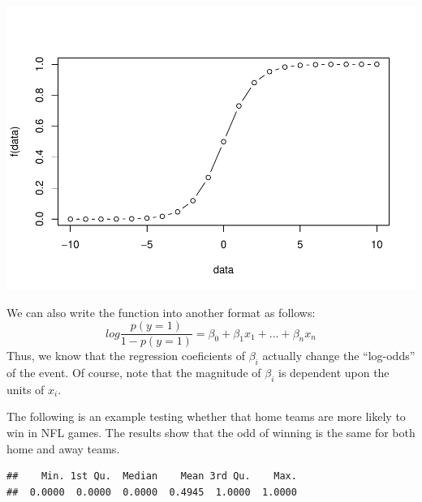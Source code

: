 \documentclass[]{book}
\newenvironment{Shaded}{\begin{snugshade}}{\end{snugshade}}
\newcommand{\KeywordTok}[1]{\textcolor[rgb]{0.13,0.29,0.53}{\textbf{#1}}}
\newcommand{\DecValTok}[1]{\textcolor[rgb]{0.00,0.00,0.81}{#1}}
\newcommand{\StringTok}[1]{\textcolor[rgb]{0.31,0.60,0.02}{#1}}
\newcommand{\OperatorTok}[1]{\textcolor[rgb]{0.81,0.36,0.00}{\textbf{#1}}}
\newcommand{\NormalTok}[1]{#1}
\begin{document}
\includegraphics{bookdown-demo_files/figure-latex/unnamed-chunk-1-1.pdf}

We can also write the function into another format as follows:
\[log \frac{p(y=1)}{1-p(y=1)}= \beta_0+\beta_1x_1+...+\beta_nx_n\] Thus,
we know that the regression coeficients of \(\beta_i\) actually change
the ``log-odds'' of the event. Of course, note that the magnitude of
\(\beta_i\) is dependent upon the units of \(x_i\).

The following is an example testing whether that home teams are more
likely to win in NFL games. The results show that the odd of winning is
the same for both home and away teams.

\begin{Shaded}
\end{Shaded}

\begin{verbatim}
##    Min. 1st Qu.  Median    Mean 3rd Qu.    Max. 
##  0.0000  0.0000  0.0000  0.4945  1.0000  1.0000
\end{verbatim}
\end{document}
